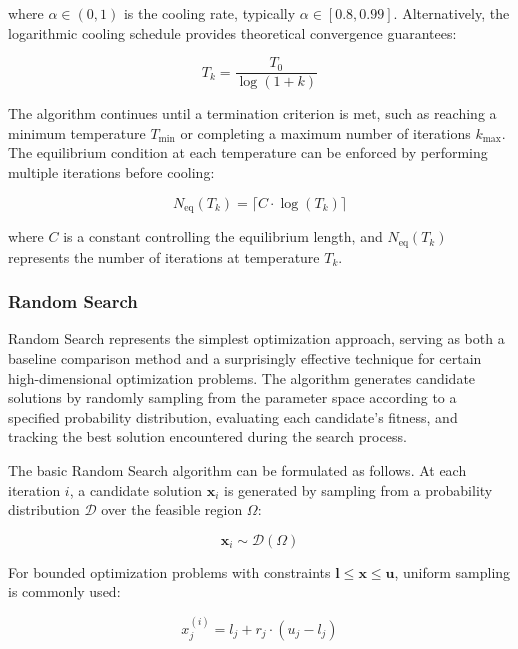 where $\alpha \in (0,1)$ is the cooling rate, typically $\alpha \in [0.8, 0.99]$. Alternatively, the logarithmic cooling schedule provides theoretical convergence guarantees:

\begin{equation}
T_k = \frac{T_0}{\log(1 + k)}
\end{equation}

The algorithm continues until a termination criterion is met, such as reaching a minimum temperature $T_{\text{min}}$ or completing a maximum number of iterations $k_{\text{max}}$. The equilibrium condition at each temperature can be enforced by performing multiple iterations before cooling:

\begin{equation}
N_{\text{eq}}(T_k) = \lceil C \cdot \log(T_k) \rceil
\end{equation}

where $C$ is a constant controlling the equilibrium length, and $N_{\text{eq}}(T_k)$ represents the number of iterations at temperature $T_k$.

\subsubsection{Random Search}

Random Search represents the simplest optimization approach, serving as both a baseline comparison method and a surprisingly effective technique for certain high-dimensional optimization problems. The algorithm generates candidate solutions by randomly sampling from the parameter space according to a specified probability distribution, evaluating each candidate's fitness, and tracking the best solution encountered during the search process.

The basic Random Search algorithm can be formulated as follows. At each iteration $i$, a candidate solution $\mathbf{x}_i$ is generated by sampling from a probability distribution $\mathcal{D}$ over the feasible region $\Omega$:

\begin{equation}
\mathbf{x}_i \sim \mathcal{D}(\Omega)
\end{equation}

For bounded optimization problems with constraints $\mathbf{l} \leq \mathbf{x} \leq \mathbf{u}$, uniform sampling is commonly used:

\begin{equation}
x_j^{(i)} = l_j + r_j \cdot (u_j - l_j)
\end{equation}

